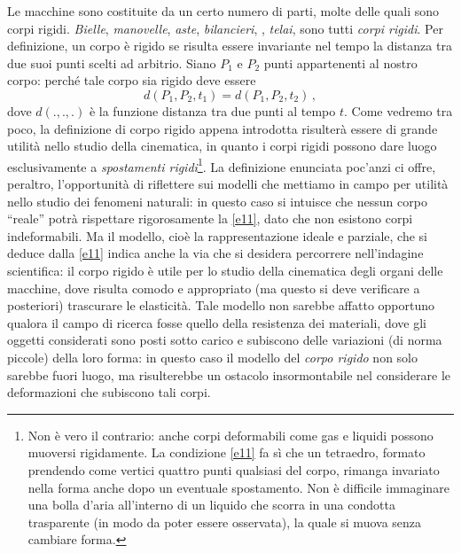 Le macchine sono costituite da un certo numero di parti, molte delle
quali 
sono corpi rigidi. {\em Bielle},   {\em manovelle}, 
{\em aste}, {\em bilancieri}, ,  {\em telai},  sono tutti {\em corpi rigidi}. 
Per definizione, un corpo \`e rigido  se risulta essere 
invariante nel tempo la distanza tra due suoi punti scelti ad arbitrio. Siano $P_1$ e $P_2$
punti appartenenti al nostro corpo: perch\'e tale corpo sia rigido deve essere
\begin{equation}
	d(P_1, P_2, t_1) = d(P_1, P_2,t_2)\,,
	\label{e11}
\end{equation}
\noindent dove $d(.,.,.)$ \`e la funzione distanza tra due punti al tempo $t$.
Come vedremo tra poco, la
definizione di corpo rigido appena introdotta
risulter\`a essere di grande utilit\`a
nello studio della cinematica, in quanto i corpi rigidi possono dare luogo
esclusivamente a {\em spostamenti rigidi}\footnote{
	Non \`e vero il contrario: anche corpi deformabili come gas e liquidi possono muoversi rigidamente. 
La condizione \ref{e11} fa s\`i che un tetraedro, formato prendendo
come vertici quattro punti qualsiasi del corpo, rimanga invariato
nella forma
anche dopo un eventuale spostamento.
Non \`e difficile immaginare una
bolla d'aria all'interno di un liquido che scorra in
una condotta trasparente (in modo da poter essere osservata), la quale si muova
senza cambiare forma.
}.
\noindent La definizione enunciata poc'anzi ci offre, peraltro, l'opportunit\`a di riflettere sui modelli che mettiamo
in campo per utilit\`a nello studio dei fenomeni naturali: in questo caso
si intuisce che nessun corpo ``reale'' potr\`a
rispettare rigorosamente la \ref{e11},
dato che non esistono corpi indeformabili.
Ma il modello, cio\`e la rappresentazione
ideale e parziale, che si deduce dalla \ref{e11} indica anche la via che si desidera
percorrere nell'indagine scientifica: il corpo rigido \`e utile per
lo studio della cinematica
degli organi delle macchine, dove risulta comodo e appropriato (ma questo si deve verificare 
a posteriori) trascurare le elasticit\`a.
Tale modello non sarebbe affatto opportuno 
qualora il campo di ricerca
fosse quello della resistenza dei materiali, dove gli oggetti considerati sono
posti sotto carico
e subiscono delle variazioni (di norma piccole) della loro forma:
in questo caso il modello del {\em corpo rigido} non
solo sarebbe fuori luogo, ma risulterebbe un 
ostacolo insormontabile nel considerare le deformazioni che subiscono tali corpi.
